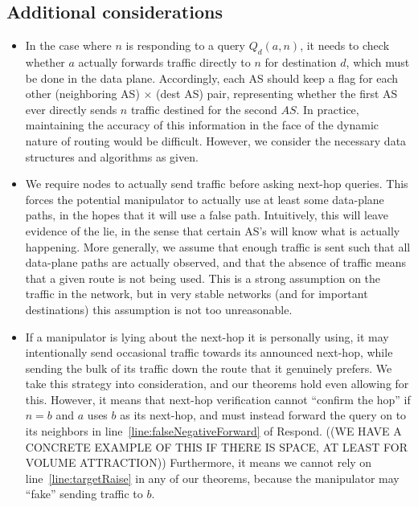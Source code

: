 \documentclass[10pt]{article}
\begin{document}
  \subsection{Additional considerations}
  \begin{itemize}
    \item In the case where $n$ is responding to a query $Q_d(a,n)$, it needs to
      check whether $a$ actually forwards traffic directly to $n$ for
      destination $d$, which must be done in the data plane. Accordingly, each
      AS should keep a flag for each other (neighboring AS) $\times$ (dest AS)
      pair, representing whether the first AS ever directly sends $n$ traffic
      destined for the second $AS$.
      In practice, maintaining the accuracy of this information in the
      face of the dynamic nature of routing would be difficult.
      However, we consider the necessary data structures and algorithms as
      given.
    \item We require nodes to actually send traffic before asking next-hop
      queries. This forces the potential manipulator to actually use at least
      some data-plane paths, in the hopes that it will use a false path.
      Intuitively, this will leave evidence of the lie, in the sense that
      certain AS's will know what is actually happening.
      More generally, we assume that enough traffic is sent such that
      all data-plane paths are actually observed, and
      that the absence of traffic means that a given route is not
      being used. This is a strong assumption on the traffic in the network, but
      in very stable networks (and for important destinations) this assumption
      is not too unreasonable.
    \item If a manipulator is lying about the next-hop it is personally using,
      it may intentionally send occasional traffic towards its announced
      next-hop, while sending the bulk of its traffic down the route that it
      genuinely prefers. We take this strategy into consideration, and our
      theorems hold even allowing for this. However, it means that next-hop
      verification cannot ``confirm the hop'' if $n=b$ and $a$ uses $b$ as
      its next-hop, and must instead forward the query on to its neighbors
      in line~\ref{line:falseNegativeForward} of {\sc Respond}.
      ((WE HAVE A CONCRETE EXAMPLE OF THIS IF THERE IS SPACE,
      AT LEAST FOR VOLUME ATTRACTION))
      Furthermore, it means we cannot rely on line~\ref{line:targetRaise}
      in any of our theorems, because the manipulator may ``fake'' sending
      traffic to $b$.
  \end{itemize}
\end{document}
